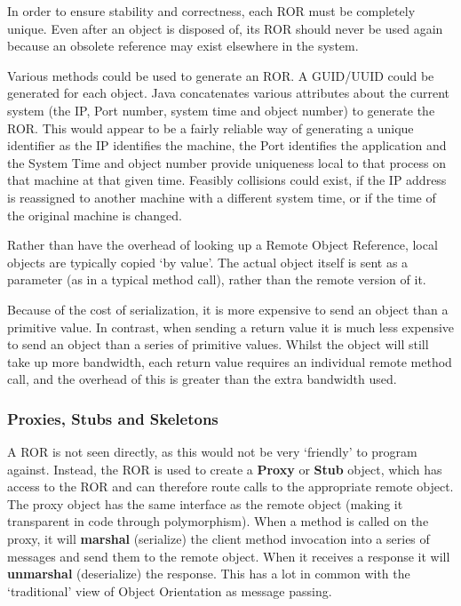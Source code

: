 \documentclass{article}
\begin{document}
In order to ensure stability and correctness, each ROR must be completely unique. Even after an object is disposed of, its ROR should never be used again because an obsolete reference may exist elsewhere in the system. 

Various methods could be used to generate an ROR. A GUID/UUID could be generated for each object. Java concatenates various attributes about the current system (the IP, Port number, system time and object number) to generate the ROR. This would appear to be a fairly reliable way of generating a unique identifier as the IP identifies the machine, the Port identifies the application and the System Time and object number provide uniqueness local to that process on that machine at that given time. Feasibly collisions could exist, if the IP address is reassigned to another machine with a different system time, or if the time of the original machine is changed. 

Rather than have the overhead of looking up a Remote Object Reference, local objects are typically copied `by value'. The actual object itself is sent as a parameter (as in a typical method call), rather than the remote version of it. 

Because of the cost of serialization, it is more expensive to send an object than a primitive value. In contrast, when sending a return value it is much less expensive to send an object than a series of primitive values. Whilst the object will still take up more bandwidth, each return value requires an individual remote method call, and the overhead of this is greater than the extra bandwidth used.

\subsubsection{Proxies, Stubs and Skeletons}
A ROR is not seen directly, as this would not be very `friendly' to program against. Instead, the ROR is used to create a \textbf{Proxy} or \textbf{Stub} object, which has access to the ROR and can therefore route calls to the appropriate remote object. The proxy object has the same interface as the remote object (making it transparent in code through polymorphism). When a method is called on the proxy, it will \textbf{marshal} (serialize) the client method invocation into a series of messages and send them to the remote object. When it receives a response it will \textbf{unmarshal} (deserialize) the response. This has a lot in common with the `traditional' view of Object Orientation as message passing.
\end{document}
